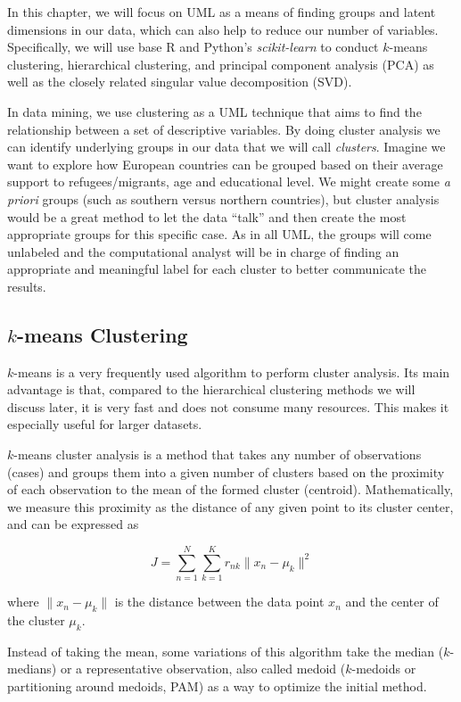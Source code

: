 In this chapter, we will focus on UML as a means of finding groups and
latent dimensions in our data, which can also help to reduce our
number of variables. Specifically, we will use base R and Python's
\emph{scikit-learn} to conduct $k$-means clustering, hierarchical
clustering, and principal component analysis (PCA) as well as the
closely related singular value decomposition (SVD).

In data mining, we use clustering as a UML technique that aims to find
the relationship between a set of descriptive variables. By doing
cluster analysis we can identify underlying groups in our data that we
will call \textit{clusters}. Imagine we want to explore how European
countries can be grouped based on their average support to
refugees/migrants, age and educational level. We might create some
\textit{a priori} groups (such as southern versus northern countries),
but cluster analysis would be a great method to let the data ``talk''
and then create the most appropriate groups for this specific case. As
in all UML, the groups will come unlabeled and the computational
analyst will be in charge of finding an appropriate and meaningful
label for each cluster to better communicate the results.

\subsection{$k$-means Clustering}\label{sec:kmeans}

$k$-means is a very frequently used algorithm to perform cluster
analysis. Its main advantage is that, compared to the hierarchical
clustering methods we will discuss later, it is very fast and does not
consume many resources. This makes it especially useful for larger
datasets.

$k$-means cluster analysis is a method that takes any number of observations (cases) and groups them into a given number of clusters based on the proximity of each observation to the mean of the formed cluster (centroid).  Mathematically, we measure this proximity as the distance of any given point to its cluster center, and can be expressed as

$$J = \sum_{n=1}^{N} \sum_{k=1}^{K} r_{nk} \|x_n - \mu_k\|^2$$

where $\|x_n - \mu_k\|$ is the distance between the data point $x_n$ and the center of the cluster $\mu_k$.

Instead of taking the mean, some variations of this algorithm take the median ($k$-medians) or a representative observation, also called medoid ($k$-medoids or partitioning around medoids, PAM) as a way to optimize the initial method.

